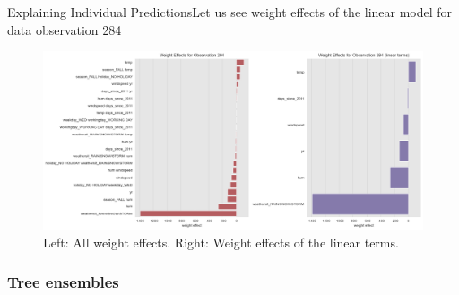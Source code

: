 \documentclass[10pt]{beamer}
\begin{document}
\begin{frame}{Explaining Individual Predictions}{Let us see weight effects of the linear model for data observation 284}
\begin{center}
  \begin{figure}
    \includegraphics[scale=0.3]{images/interpretable_ml_76_0.png}
    \caption{Left: All weight effects. Right: Weight effects of the linear terms.}\label{fig:linear-284-obs}
  \end{figure}
\end{center}
\end{frame}

\subsubsection{Tree ensembles}
\end{document}
